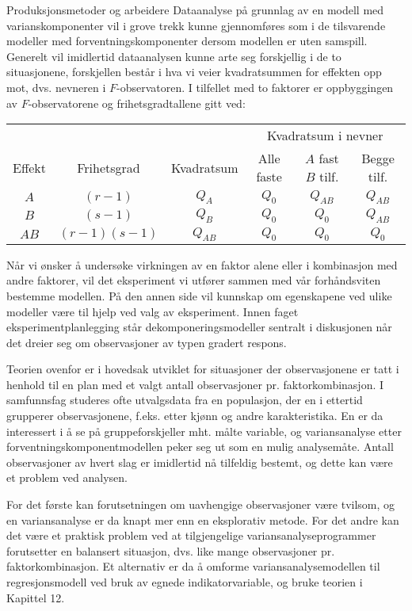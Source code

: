 \begin{eksempel}{Produksjonsmetoder og arbeidere}
Dataanalyse på grunnlag av en modell med varianskomponenter vil
i grove trekk kunne gjennomføres som i de tilsvarende modeller med
forventningskomponenter dersom modellen er uten samspill.  Generelt
vil imidlertid dataanalysen kunne arte seg forskjellig i de to
situasjonene, forskjellen består i hva vi veier kvadratsummen for effekten
opp mot, dvs. nevneren i $F$-observatoren. I tilfellet med to faktorer er
oppbyggingen av $F$-observatorene og frihetsgradtallene gitt ved:

\begin{center} \small \addtolength{\tabcolsep}{-0.3\tabcolsep}
\begin{tabular}{|c|c|c|c|c|c|} \cline{4-6}
 \multicolumn{3}{c|}{} &\multicolumn{3}{c|}{Kvadratsum i nevner}\\ \cline{1-3}
Effekt&Frihetsgrad&Kvadratsum&Alle faste&$A$ fast $B$ tilf.&Begge tilf.\\ \hline
 $A$&$(r-1)$&$Q_A$&$Q_0$&$Q_{AB}$&$Q_{AB}$ \\
 $B$&$(s-1)$&$Q_B$&$Q_0$&$Q_{0}$&$Q_{AB}$ \\
 $AB$&$(r-1)(s-1)$&$Q_{AB}$&$Q_0$&$Q_0$&$Q_0$ \\ \hline
\end{tabular}
\end{center}
Når vi ønsker å undersøke virkningen av en faktor alene 
eller i kombinasjon med andre faktorer, vil det eksperiment vi utfører
sammen med vår forhåndsviten bestemme modellen.  På den 
annen side vil kunnskap om egenskapene ved ulike modeller være til
hjelp ved valg av eksperiment.  Innen faget eksperimentplanlegging
står dekomponeringsmodeller sentralt i diskusjonen når det
dreier seg om observasjoner av typen gradert respons. 
 
Teorien ovenfor er i hovedsak utviklet for situasjoner der observasjonene
er tatt i henhold til en plan med et valgt antall observasjoner pr.
faktorkombinasjon. I samfunnsfag studeres ofte utvalgsdata fra en
populasjon, der en i ettertid grupperer observasjonene, f.eks. etter
kjønn og andre karakteristika.  En er da interessert i å
se på gruppeforskjeller mht. målte variable, og variansanalyse
etter forventningskomponentmodellen peker seg ut som en mulig analysemåte. 
Antall observasjoner av hvert slag er imidlertid nå tilfeldig bestemt, og
dette kan være et problem ved analysen.

For det første kan forutsetningen om uavhengige observasjoner være 
tvilsom, og en variansanalyse er da knapt mer enn en eksplorativ metode.
For det andre kan det være et praktisk problem ved
at tilgjengelige varians\-ana\-lyse\-pro\-gram\-mer forutsetter en balansert
 situasjon, dvs. like mange observasjoner pr. faktorkombinasjon. 
Et alternativ er da å omforme variansanalysemodellen til
regresjonsmodell ved bruk av egnede indikatorvariable, og bruke teorien i
Kapittel 12. 


\end{eksempel}
